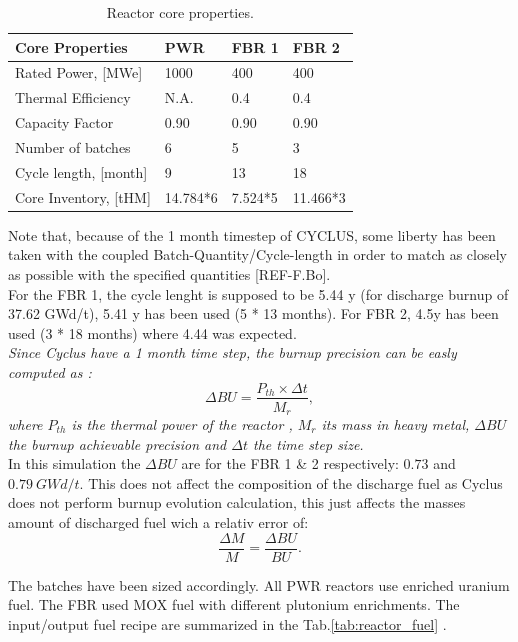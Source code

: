 \documentclass[12pt]{article}
\begin{document}
\begin{table}[h!]
\centering
\begin{tabular}{llll}
\hline
Core Properties       &	PWR     &	FBR 1   &	FBR 2     \\
\hline
Rated Power, [MWe]    &	1000		&	400     &	400       \\
Thermal Efficiency    &	N.A.		&	0.4     &	0.4       \\
Capacity Factor       &	0.90		&	0.90		&	0.90      \\
Number of batches     &	6       &	5       &	3         \\
Cycle length, [month] &	9       &	13      &	18        \\
Core Inventory, [tHM] &	14.784*6&	7.524*5	&	11.466*3  \\
\hline
\end{tabular}
\caption{Reactor core properties.}
\label{tab:reactor}
\end{table}
Note that, because of the 1 month timestep of
CYCLUS, some liberty has been taken with the
coupled Batch-Quantity/Cycle-length in order to
match as closely as possible with the specified
quantities [REF-F.Bo].\\
For the FBR 1, the cycle lenght is supposed to be
5.44 y (for discharge burnup of 37.62 GWd/t), 5.41
 y has been used (5 * 13 months). For FBR 2, 4.5y
  has been used (3 * 18 months) where 4.44 was
  expected.\\
\textit{
Since Cyclus have a 1 month time step, the
burnup precision can be easly computed as :
\begin{equation}
  \Delta BU = \frac{P_{th} \times \Delta t}{M_{r}},
\end{equation}
where $P_{th}$ is the thermal power of the reactor
, $M_{r}$ its mass in heavy metal, $\Delta BU$ the
burnup achievable precision and $\Delta t$ the
time step size.\\
}
In this simulation the $\Delta BU$ are for the FBR
1 \& 2 respectively: $0.73$ and $0.79~GWd/t$.
This does not affect the composition of the
discharge fuel as Cyclus does not perform burnup
evolution calculation, this just affects the
masses amount of discharged fuel wich a relativ
error of:
\begin{equation}
  \frac{\Delta M}{M} = \frac{\Delta BU}{BU}.
\end{equation}



The batches have been sized accordingly. All PWR
reactors use enriched uranium fuel. The FBR used
 MOX fuel with different plutonium enrichments.
The input/output fuel recipe are summarized in the
Tab.\ref{tab:reactor_fuel}
\cite{B.Feng_calculation}.
\end{document}
